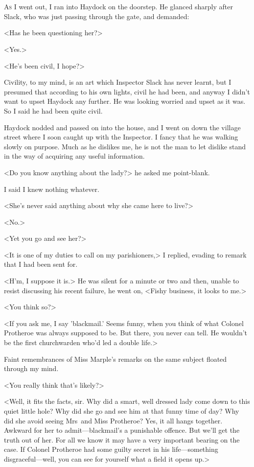 \chapter[Chapter  \thechapter]{}


\lettrine{A}{s} I went out, I ran into Haydock on the doorstep. He glanced sharply after Slack, who was just passing through the gate, and demanded:

\zz
<Has he been questioning her?>

<Yes.>

<He's been civil, I hope?>

Civility, to my mind, is an art which Inspector Slack has never learnt, but I presumed that according to his own lights, civil he had been, and anyway I didn't want to upset Haydock any further. He was looking worried and upset as it was. So I said he had been quite civil.

Haydock nodded and passed on into the house, and I went on down the village street where I soon caught up with the Inspector. I fancy that he was walking slowly on purpose. Much as he dislikes me, he is not the man to let dislike stand in the way of acquiring any useful information.

<Do you know anything about the lady?> he asked me point-blank.

I said I knew nothing whatever.

<She's never said anything about why she came here to live?>

<No.>

<Yet you go and see her?>

<It is one of my duties to call on my parishioners,> I replied, evading to remark that I had been sent for.

<H'm, I suppose it is.> He was silent for a minute or two and then, unable to resist discussing his recent failure, he went on, <Fishy business, it looks to me.>

<You think so?>

<If you ask me, I say 'blackmail.' Seems funny, when you think of what Colonel Protheroe was always supposed to be. But there, you never can tell. He wouldn't be the first churchwarden who'd led a double life.>

Faint remembrances of Miss Marple's remarks on the same subject floated through my mind.

<You really think that's likely?>

<Well, it fits the facts, sir. Why did a smart, well dressed lady come down to this quiet little hole? Why did she go and see him at that funny time of day? Why did she avoid seeing Mrs~and Miss Protheroe? Yes, it all hangs together. Awkward for her to admit—blackmail's a punishable offence. But we'll get the truth out of her. For all we know it may have a very important bearing on the case. If Colonel Protheroe had some guilty secret in his life—something disgraceful—well, you can see for yourself what a field it opens up.>

